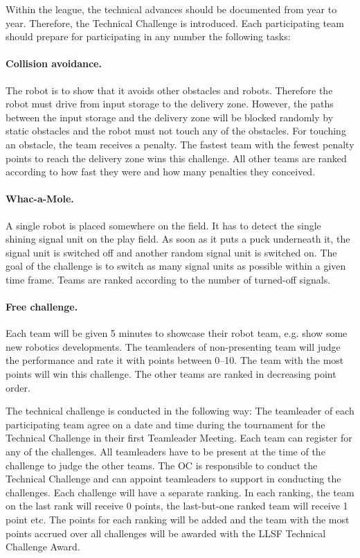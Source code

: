 \documentclass[12pt,twoside]{article}
\begin{document}
  Within the league, the technical advances should be documented from
  year to year. Therefore, the Technical Challenge is introduced.
  Each participating team should prepare for participating in any
  number the following tasks:


  \paragraph{Collision avoidance.~}
  The robot is to show that it avoids other obstacles and robots.
  Therefore the robot must drive from input storage to the delivery zone.
  However, the paths between the input storage and the delivery zone will
  be blocked randomly by static obstacles and the robot must not touch any
  of the obstacles. For touching an obstacle, the team receives a penalty.
  The fastest team with the fewest penalty points to reach the delivery
  zone wins this challenge. All other teams are ranked according to
  how fast they were and how many penalties they conceived.
  
  \paragraph{Whac-a-Mole.~}
  A single robot is placed somewhere on the field. It has to detect
  the single shining signal unit on the play field. As soon as it puts
  a puck underneath it, the signal unit is switched off and another
  random signal unit is switched on. The goal of the challenge is to
  switch as many signal units as possible within a given time
  frame. Teams are ranked according to the number of turned-off
  signals.
  
  \paragraph{Free challenge.~}
  Each team will be given 5 minutes to showcase their robot team, e.g.
  show some new robotics developments. The teamleaders of
  non-presenting team will judge the performance and rate it with
  points between 0--10.  The team with the most points will win this
  challenge. The other teams are ranked in decreasing point order.


  The technical challenge is conducted in the following way: The
  teamleader of each participating team agree on a date and time
  during the tournament for the Technical Challenge in their first
  Teamleader Meeting. Each team can register for any of the
  challenges. All teamleaders have to be present at the time of the
  challenge to judge the other teams. The OC is responsible to conduct
  the Technical Challenge and can appoint teamleaders to support in
  conducting the challenges. Each challenge will have a separate
  ranking. In each ranking, the team on the last rank will receive 0
  points, the last-but-one ranked team will receive 1 point etc. The
  points for each ranking will be added and the team with the most
  points accrued over all challenges will be awarded with the
  LLSF Technical Challenge Award.
\end{document}
